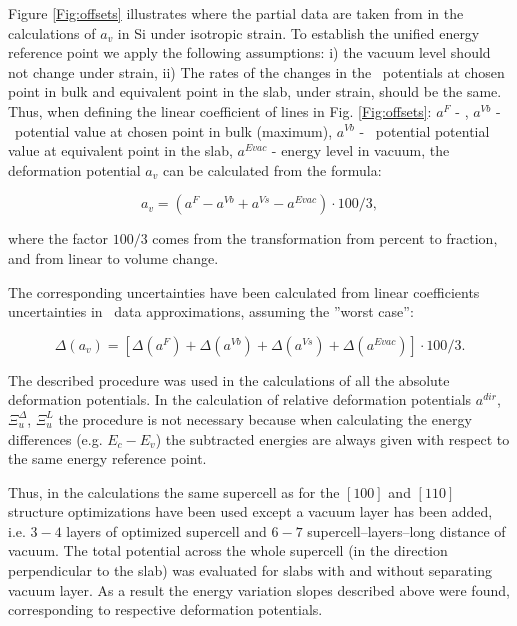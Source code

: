 Figure \ref{Fig:offsets} illustrates where the partial data are taken from in the calculations of $a_v$ in Si under isotropic strain.
To establish the unified energy reference point we apply the following assumptions: i) the vacuum level should not change under strain, ii) The rates of the changes in the \SC\ potentials at chosen point in bulk and equivalent point in the slab, under strain, should be the same.
Thus, when defining the linear coefficient of lines in Fig. \ref{Fig:offsets}: $a^F$ - \VBM, $a^{Vb}$ - \SC\ potential value at chosen point in bulk (maximum), $a^{Vb}$ - \SC\ potential potential value at equivalent point in the slab, $a^{Evac}$ - energy level in vacuum, the deformation potential $a_v$ can be calculated from the formula:

\begin{equation}
\label{Eq:av}
a_v=(a^F - a^{Vb} + a^{Vs} - a^{Evac})\cdot100/3,
\end{equation}

where the factor $100/3$ comes from the transformation from percent to fraction, and from linear to volume change.

The corresponding uncertainties have been calculated from linear coefficients uncertainties in \abinitio\ data approximations, assuming the ''worst case'': 

\begin{equation}
\label{Eq:Dav}
\Delta(a_v)=[\Delta(a^F) + \Delta(a^{Vb}) + \Delta(a^{Vs}) + \Delta(a^{Evac})]\cdot100/3.
\end{equation}

The described procedure was used in the calculations of all the absolute deformation potentials.
In the calculation of relative deformation potentials $a^{dir}$, $\Xi_u^{\Delta}$, $\Xi_u^{L}$ the procedure is not necessary because when calculating the energy differences (e.g. $E_c-E_v$) the subtracted energies are always given with respect to the same energy reference point.

Thus, in the calculations the same supercell as for the $[100]$ and $[110]$ structure optimizations have been used except a vacuum layer has been added, i.e.  $3-4$ layers of optimized supercell and $6-7$ supercell--layers--long distance of vacuum.
The total potential across the whole supercell (in the direction perpendicular to the slab) was evaluated for slabs with and without separating vacuum layer.
As a result the energy variation slopes described above were found, corresponding to respective deformation potentials.

